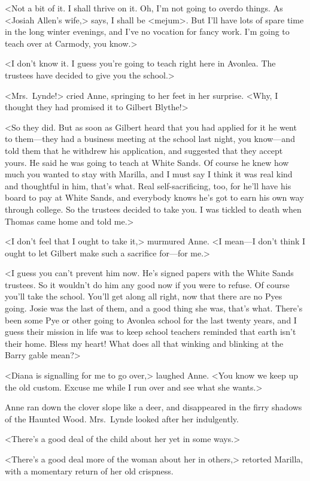 <Not a bit of it. I shall thrive on it. Oh, I'm not going to overdo things. As <Josiah Allen's wife,> says, I shall be <mejum>. But I'll have lots of spare time in the long winter evenings, and I've no vocation for fancy work. I'm going to teach over at Carmody, you know.>

<I don't know it. I guess you're going to teach right here in Avonlea. The trustees have decided to give you the school.>

<Mrs.~Lynde!> cried Anne, springing to her feet in her surprise. <Why, I thought they had promised it to Gilbert Blythe!>

<So they did. But as soon as Gilbert heard that you had applied for it he went to them—they had a business meeting at the school last night, you know—and told them that he withdrew his application, and suggested that they accept yours. He said he was going to teach at White Sands. Of course he knew how much you wanted to stay with Marilla, and I must say I think it was real kind and thoughtful in him, that's what. Real self-sacrificing, too, for he'll have his board to pay at White Sands, and everybody knows he's got to earn his own way through college. So the trustees decided to take you. I was tickled to death when Thomas came home and told me.>

<I don't feel that I ought to take it,> murmured Anne. <I mean—I don't think I ought to let Gilbert make such a sacrifice for—for me.>

<I guess you can't prevent him now. He's signed papers with the White Sands trustees. So it wouldn't do him any good now if you were to refuse. Of course you'll take the school. You'll get along all right, now that there are no Pyes going. Josie was the last of them, and a good thing she was, that's what. There's been some Pye or other going to Avonlea school for the last twenty years, and I guess their mission in life was to keep school teachers reminded that earth isn't their home. Bless my heart! What does all that winking and blinking at the Barry gable mean?>

<Diana is signalling for me to go over,> laughed Anne. <You know we keep up the old custom. Excuse me while I run over and see what she wants.>

Anne ran down the clover slope like a deer, and disappeared in the firry shadows of the Haunted Wood. Mrs.~Lynde looked after her indulgently.

<There's a good deal of the child about her yet in some ways.>

<There's a good deal more of the woman about her in others,> retorted Marilla, with a momentary return of her old crispness.

